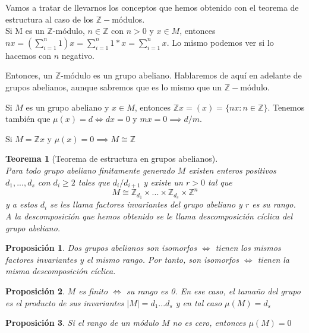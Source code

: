 \documentclass[11pt, a4paper, titlepage]{article}
\newif\IfInSansMode
\providecommand{\ent}{\mathbb{Z}}
\theoremstyle{theorem-style}
\newtheorem{nth}{Teorema}[section]
\newtheorem{nprop}{Proposición}[section]
\theoremstyle{definition-style}
\theoremstyle{remark-style}
\theoremstyle{example-style}
\begin{document}
Vamos a tratar de llevarnos los conceptos que hemos obtenido con el teorema de estructura al caso de los $\ent-$módulos.\\
Si M es un $\ent$-módulo, $n\in \ent$ con $n>0$ y $x\in M$, entonces $nx = (\sum_{i=1}^n 1)x = \sum_{i=1}^n 1*x = \sum_{i=1}^n x$. Lo mismo podemos ver si lo hacemos con $n$ negativo.

Entonces, un $\ent$-módulo es un grupo abeliano. Hablaremos de aquí en adelante de grupos abelianos, aunque sabremos que es lo mismo que un $\ent-$módulo.

Si $M$ es un grupo abeliano y $x\in M$, entonces $\ent x = (x) = \{nx : n \in \ent  \}$.
Tenemos también que $\mu(x) = d \iff dx = 0$ y $mx = 0 \implies d/m$.

Si $M=\ent x$ y $\mu(x) = 0 \implies M \cong \ent$

\begin{nth}[Teorema de estructura en grupos abelianos]\hfill \\
	Para todo grupo abeliano finitamente generado $M$ existen enteros positivos $d_1,...,d_s$ con $d_i \geq 2$ tales que $d_i/d_{i+1}$ y existe un $r> 0$ tal que
	\[
	M \cong \ent_{d_1} \times ... \times \ent_{d_s} \times \ent^n
	\]
	y a estos $d_i$ se les llama factores invariantes del grupo abeliano y $r$ es su rango.
	A la descomposición que hemos obtenido se le llama descomposición cíclica del grupo abeliano.
\end{nth}

\begin{nprop}
	Dos grupos abelianos son isomorfos $\iff$ tienen los mismos factores invariantes y el mismo rango. Por tanto, son isomorfos $\iff$ tienen la misma descomposición cíclica.
\end{nprop}

\begin{nprop}
	$M$ es finito $\iff$ su rango es 0. En ese caso, el tamaño del grupo es el producto de sus invariantes  $|M| = d_1...d_s$ y en tal caso $\mu(M) = d_s$
\end{nprop}
\begin{nprop}
	Si el rango de un módulo $M$ no es cero, entonces $\mu(M) =0$
\end{nprop}
\end{document}
